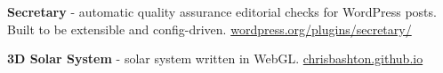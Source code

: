 \documentclass[10pt,a4paper,ragged2e,withhyper]{altacv}
\begin{document}
\begin{paracol}{2}

\vspace{\spacer}

\textbf{Secretary} - automatic quality assurance editorial checks for WordPress posts. Built to be extensible and config-driven.
\newline
\href{https://wordpress.org/plugins/secretary/}{\url{wordpress.org/plugins/secretary/}}

\medskip


\medskip

\textbf{3D Solar System} - solar system written in WebGL.
\newline
\href{https://chrisbashton.github.io}{\url{chrisbashton.github.io}}

\medskip


\medskip



\customreferences

\end{paracol}
\end{document}
